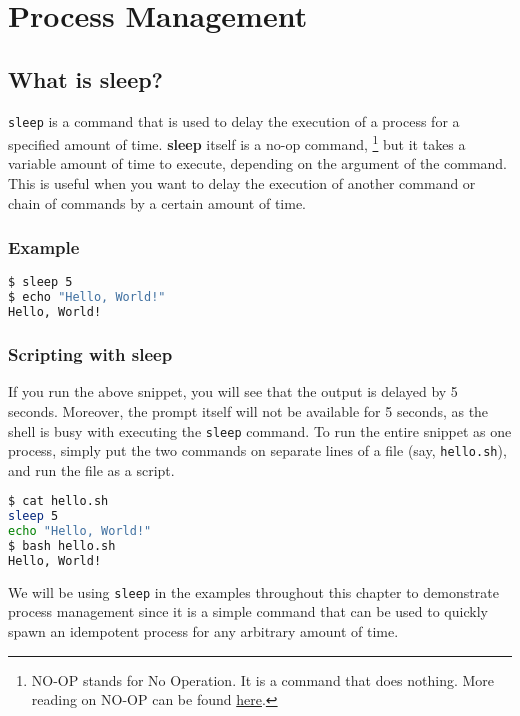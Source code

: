 \setchapterpreamble[u]{\margintoc}
\chapter{Process Management}

\section{What is sleep?}

\texttt{sleep} is a command that is used to delay the execution of a process
for a specified amount of time. \textbf{sleep} itself is a no-op command,
\footnote{
  NO-OP stands for No Operation. It is a command that does nothing.
  More reading on NO-OP can be found
  \href{https://en.wikipedia.org/wiki/NOP\_(code)}{here}.
}
but it takes a variable amount of time to execute, depending on the argument
of the command. This is useful when you want to delay the execution of another
command or chain of commands by a certain amount of time.

\subsection{Example}

\begin{lstlisting}[language=bash]
$ sleep 5
$ echo "Hello, World!"
Hello, World!
\end{lstlisting}

\subsection{Scripting with sleep}

If you run the above snippet, you will see that the output is delayed by 5 seconds.
Moreover, the prompt itself will not be available for 5 seconds, as the shell is busy
with executing the \texttt{sleep} command.
To run the entire snippet as one process, simply put the two commands on
separate lines of a file (say, \texttt{hello.sh}), and run the file as a script.

\begin{lstlisting}[language=bash]
$ cat hello.sh
sleep 5
echo "Hello, World!"
$ bash hello.sh
Hello, World!
\end{lstlisting}

We will be using \texttt{sleep} in the examples throughout this chapter to demonstrate
process management since it is a simple command that can be used to quickly
spawn an idempotent process for any arbitrary amount of time.

